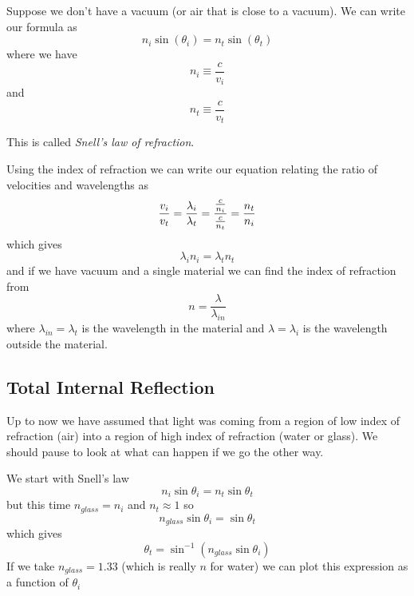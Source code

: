 \documentclass{article}
\begin{document}
Suppose we don't have a vacuum (or air that is close to a vacuum). We can
write our formula as 
\begin{equation}
n_{i}\sin \left( \theta _{i}\right) =n_{t}\sin \left( \theta _{t}\right)
\end{equation}%
where we have 
\begin{equation}
n_{i}\equiv \frac{c}{v_{i}}
\end{equation}%
and 
\begin{equation}
n_{t}\equiv \frac{c}{v_{t}}
\end{equation}

This is called \emph{Snell's law of refraction}.

Using the index of refraction we can write our equation relating the ratio
of velocities and wavelengths as%
\begin{equation}
\frac{v_{i}}{v_{t}}=\frac{\lambda _{i}}{\lambda _{t}}=\frac{\frac{c}{n_{i}}}{%
\frac{c}{n_{t}}}=\frac{n_{t}}{n_{i}}
\end{equation}%
which gives 
\begin{equation}
\lambda _{i}n_{i}=\lambda _{t}n_{t}
\end{equation}%
and if we have vacuum and a single material we can find the index of
refraction from 
\begin{equation}
n=\frac{\lambda }{\lambda _{in}}
\end{equation}%
where $\lambda _{in}=\lambda _{t}$ is the wavelength in the material and $%
\lambda =\lambda _{i}$ is the wavelength outside the material.

\subsection{Total Internal Reflection}

Up to now we have assumed that light was coming from a region of low index
of refraction (air) into a region of high index of refraction (water or
glass). We should pause to look at what can happen if we go the other way.%

We start with Snell's law%
\begin{equation}
n_{i}\sin \theta _{i}=n_{t}\sin \theta _{t}
\end{equation}%
but this time $n_{glass}=n_{i}$ and $n_{t}\approx 1$ so 
\begin{equation}
n_{glass}\sin \theta _{i}=\sin \theta _{t}
\end{equation}%
which gives 
\begin{equation}
\theta _{t}=\sin ^{-1}\left( n_{glass}\sin \theta _{i}\right)
\end{equation}%
If we take $n_{glass}=1.33$ (which is really $n$ for water) we can plot this
expression as a function of $\theta _{i}$
\end{document}

